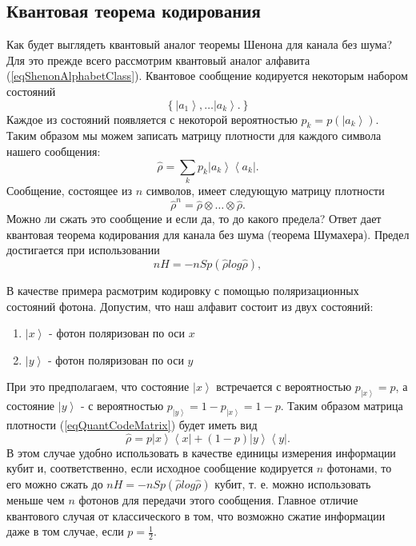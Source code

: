 \subsection{Квантовая теорема кодирования}
Как будет выглядеть квантовый аналог теоремы Шенона для канала без
шума? Для это прежде всего рассмотрим квантовый аналог алфавита
(\ref{eqShenonAlphabetClass}). Квантовое сообщение кодируется
некоторым набором состояний 
\begin{equation}
\left\{
\left|a_1\right>, \dots \left|a_k\right>.
\right\}
\label{eqSchumacherAlphabet}
\end{equation}
Каждое из состояний появляется с некоторой вероятностью $p_k =
p\left(\left|a_k\right>\right)$. Таким образом мы можем записать
матрицу плотности для каждого символа нашего сообщения:
\begin{equation}
\hat{\rho} = \sum_k p_k \left|a_k\right>\left<a_k\right|.
\label{eqQuantCodeMatrix}
\end{equation}
Сообщение, состоящее из $n$ символов, имеет следующую матрицу плотности
\begin{equation}
\hat{\rho}^n = \hat{\rho}\otimes \dots \otimes \hat{\rho}.
\nonumber
\end{equation}
Можно ли сжать это сообщение и если да, то до какого предела? Ответ
дает квантовая теорема кодирования для канала без шума (теорема
Шумахера). Предел достигается при использовании 
\begin{equation}
n H = - n Sp \left(\hat{\rho} log \hat{\rho} \right),
\nonumber
\end{equation}

В качестве примера расмотрим кодировку с помощью поляризационных
состояний фотона. Допустим, что наш алфавит состоит из двух
состояний:
\begin{enumerate}
\item $\left|x\right>$ - фотон поляризован по оси $x$ 
\item $\left|y\right>$ - фотон поляризован по оси $y$
\end{enumerate}
При это предполагаем, что состояние $\left|x\right>$ встречается с
вероятностью $p_{\left|x\right>} = p$, а состояние $\left|y\right>$ - с
вероятностью $p_{\left|y\right>} = 1 - p_{\left|x\right>} = 1 - p$.
Таким образом матрица плотности (\ref{eqQuantCodeMatrix}) будет
иметь вид
\begin{equation}
\hat{\rho} = p \left|x\right>\left<x\right| + \left(1 - p\right)
\left|y\right>\left<y\right|.
\label{eqQuantCodeMatrixQBIT}
\end{equation}
В этом случае удобно
использовать в качестве единицы измерения информации кубит и, соответственно,
если исходное сообщение кодируется $n$ фотонами, то его можно
сжать до 
\(
n H = - n Sp \left(\hat{\rho} log \hat{\rho} \right)
\)
кубит, т. е. можно использовать меньше чем $n$ фотонов для передачи
этого сообщения. Главное отличие квантового случая от классического в
том, что возможно сжатие информации даже в том случае, если $p =
\frac{1}{2}$. 




